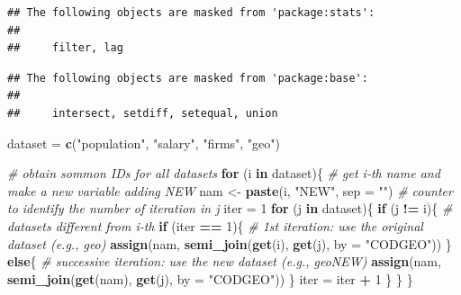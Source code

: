 \documentclass[]{article}
\newenvironment{Shaded}{\begin{snugshade}}{\end{snugshade}}
\newcommand{\KeywordTok}[1]{\textcolor[rgb]{0.13,0.29,0.53}{\textbf{#1}}}
\newcommand{\DataTypeTok}[1]{\textcolor[rgb]{0.13,0.29,0.53}{#1}}
\newcommand{\DecValTok}[1]{\textcolor[rgb]{0.00,0.00,0.81}{#1}}
\newcommand{\StringTok}[1]{\textcolor[rgb]{0.31,0.60,0.02}{#1}}
\newcommand{\CommentTok}[1]{\textcolor[rgb]{0.56,0.35,0.01}{\textit{#1}}}
\newcommand{\ControlFlowTok}[1]{\textcolor[rgb]{0.13,0.29,0.53}{\textbf{#1}}}
\newcommand{\OperatorTok}[1]{\textcolor[rgb]{0.81,0.36,0.00}{\textbf{#1}}}
\newcommand{\NormalTok}[1]{#1}
\begin{document}
\begin{verbatim}
## The following objects are masked from 'package:stats':
## 
##     filter, lag
\end{verbatim}

\begin{verbatim}
## The following objects are masked from 'package:base':
## 
##     intersect, setdiff, setequal, union
\end{verbatim}

\begin{Shaded}
\begin{Highlighting}[]
\NormalTok{dataset =}\StringTok{ }\KeywordTok{c}\NormalTok{(}\StringTok{"population"}\NormalTok{, }\StringTok{"salary"}\NormalTok{, }\StringTok{"firms"}\NormalTok{, }\StringTok{"geo"}\NormalTok{)}

\CommentTok{# obtain sommon IDs for all datasets}
\ControlFlowTok{for}\NormalTok{ (i }\ControlFlowTok{in}\NormalTok{ dataset)\{}
  \CommentTok{# get i-th name and make a new variable adding NEW}
\NormalTok{  nam <-}\StringTok{ }\KeywordTok{paste}\NormalTok{(i, }\StringTok{"NEW"}\NormalTok{, }\DataTypeTok{sep =} \StringTok{""}\NormalTok{)}
  \CommentTok{# counter to identify the number of iteration in j}
\NormalTok{  iter =}\StringTok{ }\DecValTok{1}
  \ControlFlowTok{for}\NormalTok{ (j }\ControlFlowTok{in}\NormalTok{ dataset)\{}
    \ControlFlowTok{if}\NormalTok{ (j }\OperatorTok{!=}\StringTok{ }\NormalTok{i)\{}
      \CommentTok{# datasets different from i-th}
      \ControlFlowTok{if}\NormalTok{ (iter }\OperatorTok{==}\StringTok{ }\DecValTok{1}\NormalTok{)\{}
        \CommentTok{# 1st iteration: use the original dataset (e.g., geo)}
        \KeywordTok{assign}\NormalTok{(nam, }\KeywordTok{semi_join}\NormalTok{(}\KeywordTok{get}\NormalTok{(i), }\KeywordTok{get}\NormalTok{(j), }\DataTypeTok{by =} \StringTok{"CODGEO"}\NormalTok{))}
\NormalTok{      \} }\ControlFlowTok{else}\NormalTok{\{}
        \CommentTok{# successive iteration: use the new dataset (e.g., geoNEW)}
        \KeywordTok{assign}\NormalTok{(nam, }\KeywordTok{semi_join}\NormalTok{(}\KeywordTok{get}\NormalTok{(nam), }\KeywordTok{get}\NormalTok{(j), }\DataTypeTok{by =} \StringTok{"CODGEO"}\NormalTok{))}
\NormalTok{      \}}
\NormalTok{      iter =}\StringTok{ }\NormalTok{iter }\OperatorTok{+}\StringTok{ }\DecValTok{1}
\NormalTok{    \}}
\NormalTok{  \}}
\NormalTok{\}}


\end{Highlighting}
\end{Shaded}
\end{document}
